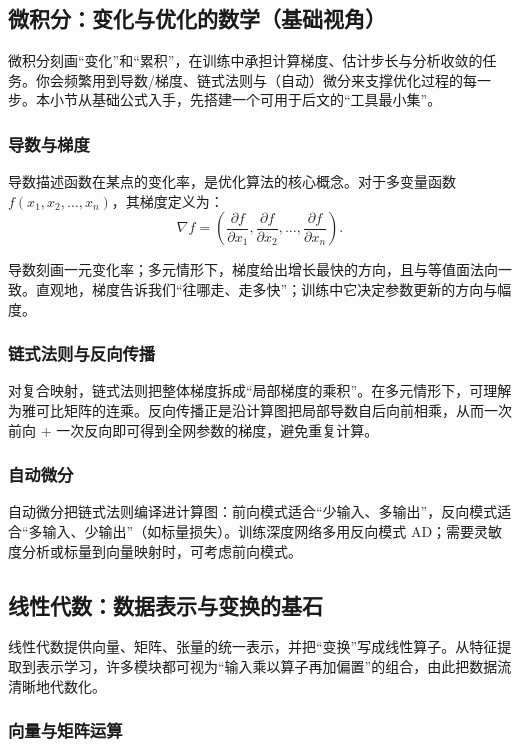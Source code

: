 \subsection{微积分：变化与优化的数学（基础视角）}

微积分刻画“变化”和“累积”，在训练中承担计算梯度、估计步长与分析收敛的任务。你会频繁用到导数/梯度、链式法则与（自动）微分来支撑优化过程的每一步。本小节从基础公式入手，先搭建一个可用于后文的“工具最小集”。

\subsubsection{导数与梯度}

导数描述函数在某点的变化率，是优化算法的核心概念。对于多变量函数 $f(x_1, x_2, \ldots, x_n)$，其梯度定义为：
$$
\nabla f = \left(\frac{\partial f}{\partial x_1}, \frac{\partial f}{\partial x_2}, \ldots, \frac{\partial f}{\partial x_n}\right).
$$

导数刻画一元变化率；多元情形下，梯度给出增长最快的方向，且与等值面法向一致。直观地，梯度告诉我们“往哪走、走多快”；训练中它决定参数更新的方向与幅度。

\subsubsection{链式法则与反向传播}

对复合映射，链式法则把整体梯度拆成“局部梯度的乘积”。在多元情形下，可理解为雅可比矩阵的连乘。反向传播正是沿计算图把局部导数自后向前相乘，从而一次前向 + 一次反向即可得到全网参数的梯度，避免重复计算。

\subsubsection{自动微分}

自动微分把链式法则编译进计算图：前向模式适合“少输入、多输出”，反向模式适合“多输入、少输出”（如标量损失）。训练深度网络多用反向模式 AD；需要灵敏度分析或标量到向量映射时，可考虑前向模式。

\subsection{线性代数：数据表示与变换的基石}

线性代数提供向量、矩阵、张量的统一表示，并把“变换”写成线性算子。从特征提取到表示学习，许多模块都可视为“输入乘以算子再加偏置”的组合，由此把数据流清晰地代数化。

\subsubsection{向量与矩阵运算}

